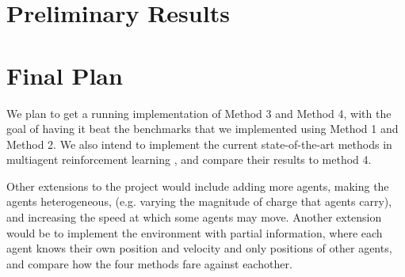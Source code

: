 \documentclass{article}
\begin{document}
\section{Preliminary Results}

\section{Final Plan}
We plan to get a running implementation of Method 3 and Method 4, with the goal
of having it beat the benchmarks that we implemented using Method 1 and Method 2.
We also intend to implement the current state-of-the-art methods
in multiagent reinforcement learning \cite{foerster2016learning, sukhbaatar2016learning, peng2017multiagent},
and compare their results to method 4.

Other extensions to the project would include adding more agents, making the agents heterogeneous,
(e.g. varying the magnitude of charge that agents carry), and increasing the speed at which
some agents may move. Another extension would be to implement the environment with partial
information, where each agent knows their own position and velocity and only positions of other
agents, and compare how the four methods fare against eachother.









\end{document}
